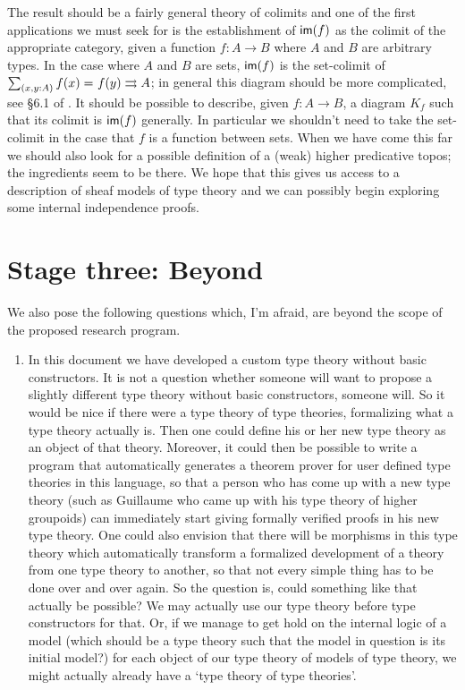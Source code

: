 The result should be a fairly general theory of colimits and one of the first
applications we must seek for is the establishment of $\mathsf{im}(f)$ as the colimit
of the appropriate category, given a function $f:A\to B$ where $A$ and $B$
are arbitrary types. In the case where $A$ and $B$ are sets, $\mathsf{im}(f)$ is
the set-colimit of $\sm{x,y:A}\id{f(x)}{f(y)}\rightrightarrows A$; in general
this diagram should be more complicated, see \S 6.1 of \cite{lurie2009higher}.
It should be possible to describe, given $f:A\to B$, a diagram $K_f$ such that
its colimit is $\mathsf{im}(f)$ generally. In particular we shouldn't need to take the
set-colimit in the case that $f$ is a function between sets.  When we have 
come this far we should also look for a possible definition of a
(weak) higher predicative topos; the ingredients seem to be there. We hope that
this gives us access to a description of sheaf models of type theory and we
can possibly begin exploring some internal independence proofs.

\section{Stage three: Beyond}
We also pose the following questions which, I'm afraid, are beyond the scope
of the proposed research program.

\begin{enumerate}
\item In this document we have developed a custom type theory without basic
constructors. It is not a question whether someone will want to propose
a slightly different type theory without basic constructors, someone will. So
it would be nice if there were a type theory of type theories, formalizing what
a type theory actually is. Then one could define his or her new type theory
as an object of that theory. Moreover, it could then be possible to write a
program that automatically generates a theorem prover for user defined type
theories in this language, so that a person who has come up with a new type
theory (such as Guillaume who came up with his type theory of higher groupoids)
can immediately start giving formally verified proofs in his new type theory.
One could also envision that there will be morphisms in this type theory which
automatically transform a formalized development of a theory from one type
theory to another, so that not every simple thing has to be done over and over
again. So the question is, could something like that actually be possible? We
may actually use our type theory before type constructors for that. Or, if we
manage to get hold on the internal logic of a model
(which should be a type theory such that the model in question is its initial
model?)
for each object of our type theory of models of type theory, we might actually
already have a `type theory of type theories'.
\end{enumerate}
